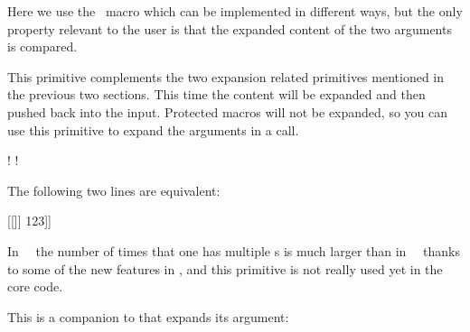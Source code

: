 \start \tttf \getbuffer \stop

Here we use the \CONTEXT\ macro \type {\doifelse} which can be implemented in
different ways, but the only property relevant to the user is that the expanded
content of the two arguments is compared.

\stopnewprimitive

\startnewprimitive[title={\prm {expanded}}]

This primitive complements the two expansion related primitives mentioned in the
previous two sections. This time the content will be expanded and then pushed
back into the input. Protected macros will not be expanded, so you can use this
primitive to expand the arguments in a call.



\startbuffer
\def\A{!}
          \def\B#1{\string#1}                    \B{\A}
          \def\B#1{\string#1} \expanded{\noexpand\B{\A}}
\protected\def\B#1{\string#1}                    \B{\A}
\stopbuffer

\typebuffer \startlines\getbuffer\stoplines

\stopnewprimitive

\startnewprimitive[title={\prm {expandedafter}}]

The following two lines are equivalent:

\startbuffer
\def\foo{123}
\expandafter[\expandafter[\expandafter\secondofthreearguments\foo]]
\expandedafter{[[\secondofthreearguments}\foo]]
\stopbuffer

\typebuffer

In \CONTEXT\ \MKIV\ the number of times that one has multiple s
is much larger than in \CONTEXT\ \LMTX\ thanks to some of the new features in
\LUAMETATEX, and this primitive is not really used yet in the core code.

\startlines\getbuffer\stoplines

\stopnewprimitive

\startnewprimitive[title={\prm {expandeddetokenize}}]

This is a companion to  that expands its argument:

